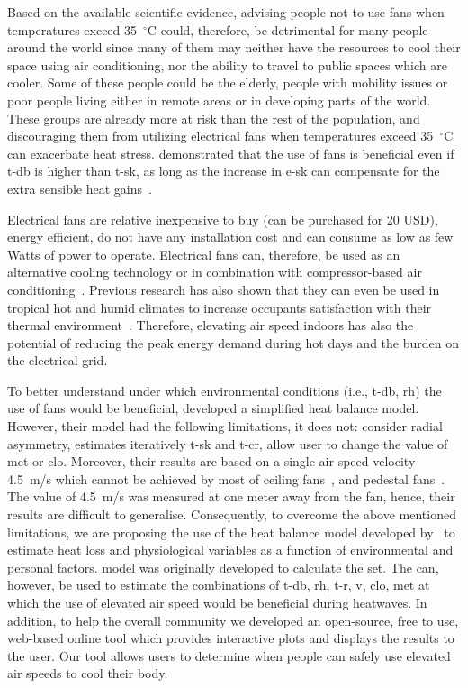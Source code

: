 Based on the available scientific evidence, advising people not to use fans when temperatures exceed 35~$^{\circ}$C could, therefore, be detrimental for many people around the world since many of them may neither have the resources to cool their space using air conditioning, nor the ability to travel to public spaces which are cooler.
Some of these people could be the elderly, people with mobility issues or poor people living either in remote areas or in developing parts of the world.
These groups are already more at risk than the rest of the population, and discouraging them from utilizing electrical fans when temperatures exceed 35~$^{\circ}$C can exacerbate heat stress.
 demonstrated that the use of fans is beneficial even if \ac{t-db} is higher than \ac{t-sk}, as long as the increase in \ac{e-sk} can compensate for the extra sensible heat gains~\cite{Jay2015}.

Electrical fans are relative inexpensive to buy (can be purchased for 20 USD), energy efficient, do not have any installation cost and can consume as low as few Watts of power to operate.
Electrical fans can, therefore, be used as an alternative cooling technology or in combination with compressor-based air conditioning~\cite{Jay2019a, Yang2015a}.
Previous research has also shown that they can even be used in tropical hot and humid climates to increase occupants satisfaction with their thermal environment~\cite{Lipczynska2018a}.
Therefore, elevating air speed indoors has also the potential of reducing the peak energy demand during hot days and the burden on the electrical grid.

To better understand under which environmental conditions (i.e., \ac{t-db}, \ac{rh}) the use of fans would be beneficial,  developed a simplified heat balance model.
However, their model had the following limitations, it does not: consider radial asymmetry, estimates iteratively \ac{t-sk} and \ac{t-cr}, allow user to change the value of \ac{met} or \ac{clo}.
Moreover, their results are based on a single air speed velocity 4.5~m/s which cannot be achieved by most of ceiling fans~\cite{Raftery2019}, and pedestal fans~\cite{Yang2015a}.
The value of 4.5~m/s was measured at one meter away from the fan, hence, their results are difficult to generalise.
Consequently, to overcome the above mentioned limitations, we are proposing the use of the heat balance model developed by~ to estimate heat loss and physiological variables as a function of environmental and personal factors.
 model was originally developed to calculate the \ac{set}.
The  can, however, be used to estimate the combinations of \ac{t-db}, \ac{rh}, \ac{t-r}, \ac{v}, \ac{clo}, \ac{met} at which the use of elevated air speed would be beneficial during heatwaves.
In addition, to help the overall community we developed an open-source, free to use, web-based online tool which provides interactive plots and displays the results to the user.
Our tool allows users to determine when people can safely use elevated air speeds to cool their body.

